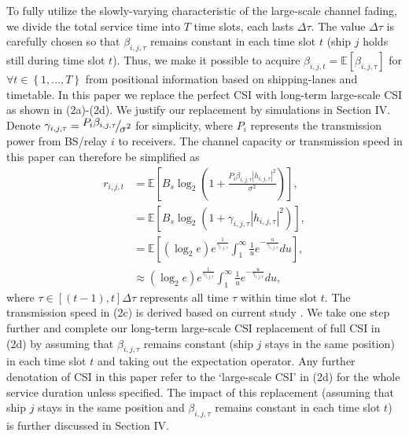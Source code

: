 \documentclass[conference]{IEEEtran}
\begin{document}
To fully utilize the slowly-varying characteristic of the large-scale channel fading, we divide the total service time into $T$ time slots, each lasts $\Delta \tau$. The value $\Delta \tau$ is carefully chosen so that $\beta _{i,j,\tau }$ remains constant in each time slot $t$ (ship $j$ holds still during time slot $t$). Thus, we make it possible to acquire $\beta _{i,j,t} = \mathbb{E} \left [ {\beta _{i,j,\tau }} \right ]$ for $\forall t \in \left\{ {1,...,T} \right\}$ from positional information based on shipping-lanes and timetable. 
In this paper we replace the perfect CSI with long-term large-scale CSI as shown in (2a)-(2d). We justify our replacement by simulations in Section IV. Denote ${\gamma _{i,j,\tau }} = {\raise0.7ex\hbox{${{P_{i} }{\beta _{i,j,\tau }}}$} \!\mathord{\left/
 {\vphantom {{{P_{i} }{\beta _{i,j,\tau }}} {{\sigma ^2}}}}\right.\kern-\nulldelimiterspace}
\!\lower0.7ex\hbox{${{\sigma ^2}}$}}$ for simplicity, where ${P_{i}}$ represents the transmission power from BS/relay $i$ to receivers. The channel capacity or transmission speed in this paper can therefore be simplified as
\begin{subequations}
\begin{align}
{r_{i,j,t}} & = {\mathbb{E}}\left [ {{B_s}{{\log }_2}\left( {1 + \frac{{{P_{i} }{\beta _{i,j,\tau }}{{\left| {{h_{i,j,\tau }}} \right|}^2}}}{{{\sigma ^2}}}} \right)} \right ] ,\\
& = {\mathbb{E}}\left [  {B_s}{\log }_2 \left( {1 + {\gamma _{i,j,\tau }}{{\left| {{h_{i,j,\tau }}} \right|}^2}} \right)  \right ] ,\\
& = {\mathbb{E}}\left [  \left( {{{\log }_2}e} \right){e^{\frac{1}{{{\gamma _{i,j,\tau }}}}}}\int_1^\infty  {\frac{1}{u}{e^{ - \frac{u}{{{\gamma _{i,j,\tau }}}}}}du} \right ] ,\\
&  \approx \left( {{{\log }_2}e} \right){e^{\frac{1}{{{\gamma _{i,j,t}}}}}}\int_1^\infty  {\frac{1}{u}{e^{ - \frac{u}{{{\gamma _{i,j,t}}}}}}du} ,
\end{align}
\end{subequations}
where $\tau  \in \left[ {\left( {t - 1} \right),t} \right]\Delta \tau$ represents all time $\tau $ within time slot $t$. 
The transmission speed in (2c) is derived based on current study \cite{p41}. We take one step further and complete our long-term large-scale CSI replacement of full CSI in (2d) by assuming that $\beta _{i,j,\tau }$ remains constant (ship $j$ stays in the same position) in each time slot $t$ and taking out the expectation operator. Any further denotation of CSI in this paper refer to the `large-scale CSI' in (2d) for the whole service duration unless specified. The impact of this replacement (assuming that ship $j$ stays in the same position and $\beta _{i,j,\tau }$ remains constant in each time slot $t$) is further discussed in Section IV. 
\end{document}
